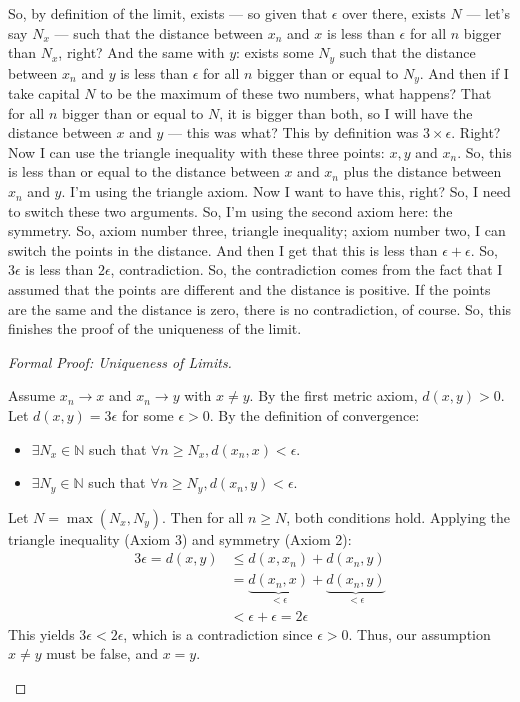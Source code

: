 \begin{spoken-clean}[00:11:03 - 00:12:38]
So, by definition of the limit, exists — so given that $\epsilon$ over there, exists $N$ — let's say $N_x$ — such that the distance between $x_n$ and $x$ is less than $\epsilon$ for all $n$ bigger than $N_x$, right? And the same with $y$: exists some $N_y$ such that the distance between $x_n$ and $y$ is less than $\epsilon$ for all $n$ bigger than or equal to $N_y$. And then if I take capital $N$ to be the maximum of these two numbers, what happens? That for all $n$ bigger than or equal to $N$, it is bigger than both, so I will have the distance between $x$ and $y$ — this was what? This by definition was $3 \times \epsilon$. Right? Now I can use the triangle inequality with these three points: $x, y$ and $x_n$. So, this is less than or equal to the distance between $x$ and $x_n$ plus the distance between $x_n$ and $y$. I'm using the triangle axiom. Now I want to have this, right? So, I need to switch these two arguments. So, I'm using the second axiom here: the symmetry. So, axiom number three, triangle inequality; axiom number two, I can switch the points in the distance. And then I get that this is less than $\epsilon + \epsilon$. So, $3\epsilon$ is less than $2\epsilon$, contradiction. So, the contradiction comes from the fact that I assumed that the points are different and the distance is positive. If the points are the same and the distance is zero, there is no contradiction, of course. So, this finishes the proof of the uniqueness of the limit.
\end{spoken-clean}

\begin{proof}[Formal Proof: Uniqueness of Limits]
\begin{math-stroke}
Assume $x_n \to x$ and $x_n \to y$ with $x \neq y$. By the first metric axiom, $d(x, y) > 0$. Let $d(x, y) = 3\epsilon$ for some $\epsilon > 0$.
By the definition of convergence:
\begin{itemize}
    \item $\exists N_x \in \mathbb{N}$ such that $\forall n \ge N_x, d(x_n, x) < \epsilon$.
    \item $\exists N_y \in \mathbb{N}$ such that $\forall n \ge N_y, d(x_n, y) < \epsilon$.
\end{itemize}
Let $N = \max(N_x, N_y)$. Then for all $n \ge N$, both conditions hold. Applying the triangle inequality (Axiom 3) and symmetry (Axiom 2):
\begin{align*}
3\epsilon = d(x, y) &\le d(x, x_n) + d(x_n, y) \\
&= \underbrace{d(x_n, x)}_{< \epsilon} + \underbrace{d(x_n, y)}_{< \epsilon} \\
&< \epsilon + \epsilon = 2\epsilon
\end{align*}
This yields $3\epsilon < 2\epsilon$, which is a contradiction since $\epsilon > 0$. Thus, our assumption $x \neq y$ must be false, and $x = y$.
\end{math-stroke}
\end{proof}

